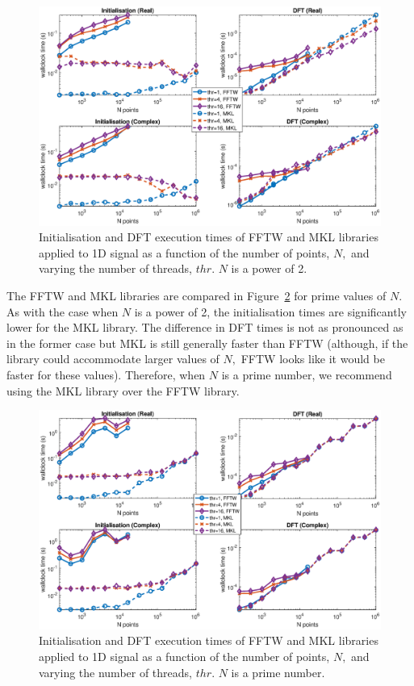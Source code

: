 \documentclass[a4paper]{article}
\begin{document}
\begin{figure}[!htb]
    \centering
    \includegraphics[width=0.9\linewidth]{../results/fftw_mkl_2_1d_thr.eps}
  \caption{Initialisation and DFT execution times of FFTW and MKL libraries applied to 1D signal as a function of the
    number of points, $N,$ and varying the number of threads, $thr.$ $N$ is a power of 2.}
  \label{1DFFTWMKL2}
\end{figure}



The FFTW and MKL libraries are compared in Figure~\ref{1DFFTWMKLPrime}
for prime values of $N.$ As with the case when $N$ is a power of 2,
the initialisation times are significantly lower for the MKL
library. The difference in DFT times is not as pronounced as in the
former case but MKL is still generally faster than FFTW (although, if
the library could accommodate larger values of $N,$ FFTW looks like it
would be faster for these values). Therefore, when $N$ is a prime
number, we recommend using the MKL library over the FFTW library.

\begin{figure}[!htb]
    \centering
    \includegraphics[width=0.9\linewidth]{../results/fftw_mkl_prime_1d_thr.eps}
  \caption{Initialisation and DFT execution times of FFTW and MKL libraries applied to 1D signal as a function of the
    number of points, $N,$ and varying the number of threads, $thr.$ $N$ is a prime number.}
  \label{1DFFTWMKLPrime}
\end{figure}
\end{document}
